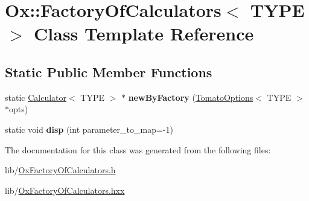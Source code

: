 \hypertarget{class_ox_1_1_factory_of_calculators}{}\section{Ox\+:\+:Factory\+Of\+Calculators$<$ T\+Y\+PE $>$ Class Template Reference}
\label{class_ox_1_1_factory_of_calculators}
\subsection*{Static Public Member Functions}
\begin{DoxyCompactItemize}
\item 
static \hyperlink{class_ox_1_1_calculator}{Calculator}$<$ T\+Y\+PE $>$ $\ast$ {\bfseries new\+By\+Factory} (\hyperlink{class_ox_1_1_tomato_options}{Tomato\+Options}$<$ T\+Y\+PE $>$ $\ast$opts)\hypertarget{class_ox_1_1_factory_of_calculators_a43c28f519cc510bc1c8d1a86b14512b4}{}\label{class_ox_1_1_factory_of_calculators_a43c28f519cc510bc1c8d1a86b14512b4}

\item 
static void {\bfseries disp} (int parameter\+\_\+to\+\_\+map=-\/1)\hypertarget{class_ox_1_1_factory_of_calculators_a80052ba880fca49a529c839b33927b21}{}\label{class_ox_1_1_factory_of_calculators_a80052ba880fca49a529c839b33927b21}

\end{DoxyCompactItemize}


The documentation for this class was generated from the following files\+:\begin{DoxyCompactItemize}
\item 
lib/\hyperlink{_ox_factory_of_calculators_8h}{Ox\+Factory\+Of\+Calculators.\+h}\item 
lib/\hyperlink{_ox_factory_of_calculators_8hxx}{Ox\+Factory\+Of\+Calculators.\+hxx}\end{DoxyCompactItemize}

